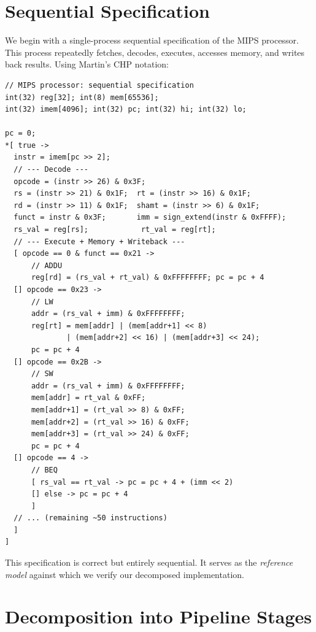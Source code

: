 \documentclass[11pt]{article}
\begin{document}
\section{Sequential Specification}
\label{sec:sequential}

We begin with a single-process sequential specification of the MIPS processor.
This process repeatedly fetches, decodes, executes, accesses memory, and writes
back results.  Using Martin's CHP notation:

\begin{lstlisting}[style=csp,caption={Sequential MIPS specification (single process)}]
// MIPS processor: sequential specification
int(32) reg[32]; int(8) mem[65536];
int(32) imem[4096]; int(32) pc; int(32) hi; int(32) lo;

pc = 0;
*[ true ->
  instr = imem[pc >> 2];
  // --- Decode ---
  opcode = (instr >> 26) & 0x3F;
  rs = (instr >> 21) & 0x1F;  rt = (instr >> 16) & 0x1F;
  rd = (instr >> 11) & 0x1F;  shamt = (instr >> 6) & 0x1F;
  funct = instr & 0x3F;       imm = sign_extend(instr & 0xFFFF);
  rs_val = reg[rs];            rt_val = reg[rt];
  // --- Execute + Memory + Writeback ---
  [ opcode == 0 & funct == 0x21 ->
      // ADDU
      reg[rd] = (rs_val + rt_val) & 0xFFFFFFFF; pc = pc + 4
  [] opcode == 0x23 ->
      // LW
      addr = (rs_val + imm) & 0xFFFFFFFF;
      reg[rt] = mem[addr] | (mem[addr+1] << 8)
              | (mem[addr+2] << 16) | (mem[addr+3] << 24);
      pc = pc + 4
  [] opcode == 0x2B ->
      // SW
      addr = (rs_val + imm) & 0xFFFFFFFF;
      mem[addr] = rt_val & 0xFF;
      mem[addr+1] = (rt_val >> 8) & 0xFF;
      mem[addr+2] = (rt_val >> 16) & 0xFF;
      mem[addr+3] = (rt_val >> 24) & 0xFF;
      pc = pc + 4
  [] opcode == 4 ->
      // BEQ
      [ rs_val == rt_val -> pc = pc + 4 + (imm << 2)
      [] else -> pc = pc + 4
      ]
  // ... (remaining ~50 instructions)
  ]
]
\end{lstlisting}

This specification is correct but entirely sequential.  It serves as the
\emph{reference model} against which we verify our decomposed implementation.

\section{Decomposition into Pipeline Stages}
\label{sec:decomposition}
\end{document}
